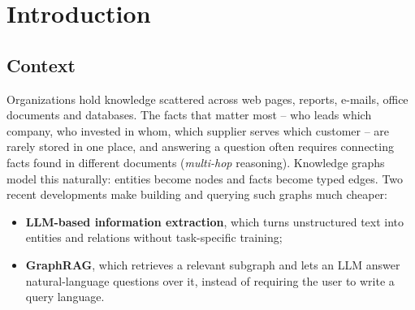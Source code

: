 \documentclass[11pt,a4paper]{report}
\begin{document}
\begin{abstract}
This report presents the design, implementation and evaluation of an AI-powered knowledge graph analytics
platform. Information is collected from heterogeneous sources (websites, a REST API, PDF and Word
documents, e-mails, plain-text files and a relational database), stored in HDFS, and converted into entities and
relationships by a large language model (LLM). A rule-based entity-resolution step and a Spark ETL job validate,
deduplicate and load the result into a Neo4j knowledge graph. On top of this single graph we compare two analytical
approaches: \emph{structured graph analytics} (Cypher queries and Neo4j Graph Data Science algorithms) and
\emph{GraphRAG} (graph retrieval combined with LLM generation). The whole system runs as a Docker Compose
proof of concept with a local, CPU-only model (\texttt{qwen2.5:3b}).

On a hand-annotated benchmark of 12 questions, the LLM extracts entities with an F1 of 0.86 and relations with an
F1 of 0.71 after schema validation. Entity resolution removes every duplicate node and doubles Cypher accuracy on
multi-hop questions (0.17 to 0.33). Cypher answers in about 10\,ms with no inference cost and wins on aggregation;
GraphRAG takes about 57\,s and 1\,200 tokens per question but wins on semantic questions and can answer from entity
descriptions when an edge is missing. Every answer is backed by source citations, none of them invalid.
\end{abstract}

\tableofcontents

\chapter{Introduction}

\section{Context}
Organizations hold knowledge scattered across web pages, reports, e-mails, office documents and databases. The
facts that matter most -- who leads which company, who invested in whom, which supplier serves which customer --
are rarely stored in one place, and answering a question often requires connecting facts found in different
documents (\emph{multi-hop} reasoning). Knowledge graphs model this naturally: entities become nodes and facts
become typed edges. Two recent developments make building and querying such graphs much cheaper:
\begin{itemize}
  \item \textbf{LLM-based information extraction}, which turns unstructured text into entities and relations
        without task-specific training;
  \item \textbf{GraphRAG}, which retrieves a relevant subgraph and lets an LLM answer natural-language questions
        over it, instead of requiring the user to write a query language.
\end{itemize}
\end{document}
